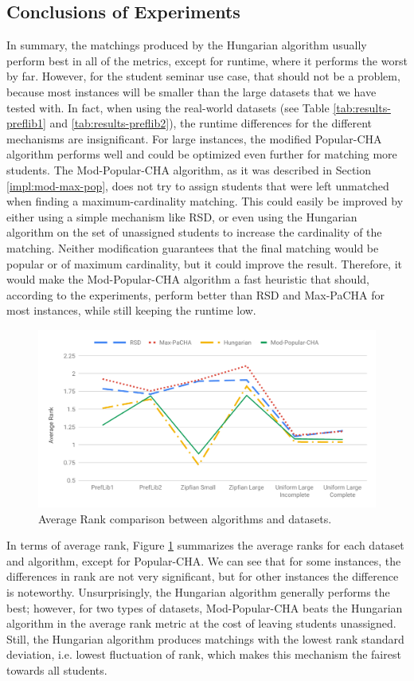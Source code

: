 \subsection{Conclusions of Experiments}
In summary, the matchings produced by the Hungarian algorithm usually perform best in all of the metrics, except for runtime, where it performs the worst by far. However, for the student seminar use case, that should not be a problem, because most instances will be smaller than the large datasets that we have tested with. In fact, when using the real-world datasets (see Table \ref{tab:results-preflib1} and \ref{tab:results-preflib2}), the runtime differences for the different mechanisms are insignificant. For large instances, the modified Popular-CHA algorithm performs well and could be optimized even further for matching more students. The Mod-Popular-CHA algorithm, as it was described in Section \ref{impl:mod-max-pop}, does not try to assign students that were left unmatched when finding a maximum-cardinality matching. This could easily be improved by either using a simple mechanism like RSD, or even using the Hungarian algorithm on the set of unassigned students to increase the cardinality of the matching. Neither modification guarantees that the final matching would be popular or of maximum cardinality, but it could improve the result. Therefore, it would make the Mod-Popular-CHA algorithm a fast heuristic that should, according to the experiments, perform better than RSD and Max-PaCHA for most instances, while still keeping the runtime low.

\begin{figure}[h!]
  \centering
    \includegraphics[width=0.8\linewidth]{assets/plots/average_ranks_all.pdf}
    \caption{Average Rank comparison between algorithms and datasets.}
    \label{fig:average_ranks}
\end{figure}

In terms of average rank, Figure \ref{fig:average_ranks} summarizes the average ranks for each dataset and algorithm, except for Popular-CHA. We can see that for some instances, the differences in rank are not very significant, but for other instances the difference is noteworthy. Unsurprisingly, the Hungarian algorithm generally performs the best; however, for two types of datasets, Mod-Popular-CHA beats the Hungarian algorithm in the average rank metric at the cost of leaving students unassigned. Still, the Hungarian algorithm produces matchings with the lowest rank standard deviation, i.e. lowest fluctuation of rank, which makes this mechanism the fairest towards all students.

